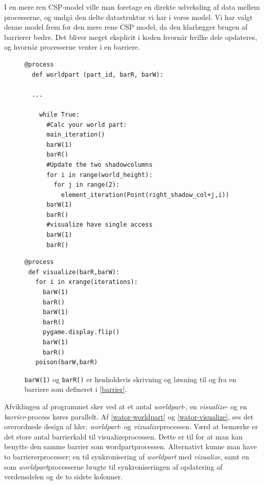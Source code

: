 I en mere ren CSP-model ville man foretage en direkte udveksling af data mellem 
processerne, og undgå den delte datastruktur vi har i vores model.  Vi har 
valgt denne model frem for den mere rene CSP model, da den klarlægger brugen af 
barrierer bedre.  Det bliver meget eksplicit i koden hvornår hvilke dele 
opdateres, og hvornår processerne venter i en barriere.

\begin{figure}[hbtp]
\begin{minipage}{\linewidth}
\begin{lstlisting}[label=wator-worldpart,caption=Uddrag af processen 
  \emph{worldpart} i Wator]
  @process
  def worldpart (part_id, barR, barW):
  
  ...
  
    while True:
      #Calc your world part:
      main_iteration()
      barW(1)
      barR()
      #Update the two shadowcolumns
      for i in range(world_height):
        for j in range(2):
          element_iteration(Point(right_shadow_col+j,i))
      barW(1)
      barR()
      #visualize have single access
      barW(1)
      barR()
\end{lstlisting}

\begin{lstlisting}[label=wator-visualize,caption=Processen \emph{visualize} i 
  Wator]
@process
 def visualize(barR,barW):
   for i in xrange(iterations):
     barW(1)
     barR()
     barW(1)
     barR()
     pygame.display.flip()
     barW(1)
     barR()
   poison(barW,barR)
\end{lstlisting}

\end{minipage}
\caption[test]{\texttt{barW(1)} og \texttt{barR()} er henholdsvis skrivning og læsning til og 
fra en barriere som defineret i \cref{barrier}.}
\end{figure}
Afviklingen af programmet sker ved at et antal \emph{worldpart}-, en 
\emph{visualize}- og en \emph{barrier}-process køres parallelt. Af 
 \autoref{wator-worldpart} og \vref{wator-visualize}, ses det overordnede design af hhv. \emph{worldpart}- og \emph{vizualize}processen.  Værd at bemærke er det store antal barrierkald til visualizeprocessen. Dette er til for at man kan benytte den samme barrier som wordpartprocessen. Alternativt kunne man have to barriererprocesser; en til synkronisering af \emph{worldpart} med \emph{vizualize}, samt en som \emph{worldpart}processerne brugte til synkroniseringen af opdatering af verdensdelen og de to sidste kolonner. 

